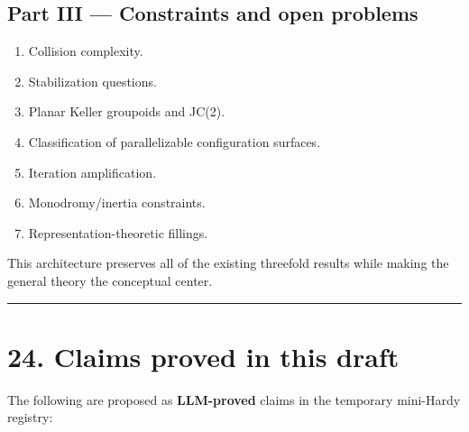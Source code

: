 \subsection{Part III --- Constraints and open
problems}\label{part-iii-constraints-and-open-problems}

\begin{enumerate}
\def\labelenumi{\arabic{enumi}.}
\setcounter{enumi}{19}
\tightlist
\item
  Collision complexity.
\item
  Stabilization questions.
\item
  Planar Keller groupoids and JC(2).
\item
  Classification of parallelizable configuration surfaces.
\item
  Iteration amplification.
\item
  Monodromy/inertia constraints.
\item
  Representation-theoretic fillings.
\end{enumerate}

This architecture preserves all of the existing threefold results while
making the general theory the conceptual center.

\begin{center}\rule{0.5\linewidth}{0.5pt}\end{center}

\section{24. Claims proved in this
draft}\label{claims-proved-in-this-draft}

The following are proposed as \textbf{LLM-proved} claims in the
temporary mini-Hardy registry:

